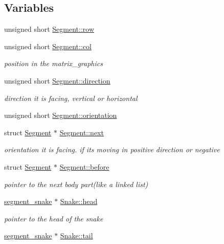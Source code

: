 \subsection*{Variables}
\begin{DoxyCompactItemize}
\item 
unsigned short \hyperlink{group__snake_ga5c86edfec316ae4d5033a85525babed6}{Segment\+::row}
\item 
unsigned short \hyperlink{group__snake_ga3369387554e0ec37bb04c153c3529ed9}{Segment\+::col}
\begin{DoxyCompactList}\small\item\em position in the matrix\+\_\+graphics \end{DoxyCompactList}\item 
unsigned short \hyperlink{group__snake_gacf610091b7f59fb0f1f37c6df4e14c18}{Segment\+::direction}
\begin{DoxyCompactList}\small\item\em direction it is facing, vertical or horizontal \end{DoxyCompactList}\item 
unsigned short \hyperlink{group__snake_gadd6c62d3fd2c3aab9175c07694fdc075}{Segment\+::orientation}
\item 
struct \hyperlink{structSegment}{Segment} $\ast$ \hyperlink{group__snake_ga20fb1741f720a656ec35972c2305a2d9}{Segment\+::next}
\begin{DoxyCompactList}\small\item\em orientation it is facing. if its moving in positive direction or negative \end{DoxyCompactList}\item 
struct \hyperlink{structSegment}{Segment} $\ast$ \hyperlink{group__snake_ga60c4d032ff0baffc3c99c1630dae24e3}{Segment\+::before}
\begin{DoxyCompactList}\small\item\em pointer to the next body part(like a linked list) \end{DoxyCompactList}\item 
\hyperlink{group__snake_ga40f634d31a1f9372bd182d65da207a21}{segment\+\_\+snake} $\ast$ \hyperlink{group__snake_gaf63e50ac65f365d67ae3975a178cba8c}{Snake\+::head}
\begin{DoxyCompactList}\small\item\em pointer to the head of the snake \end{DoxyCompactList}\item 
\hyperlink{group__snake_ga40f634d31a1f9372bd182d65da207a21}{segment\+\_\+snake} $\ast$ \hyperlink{group__snake_gada92e10f60af5b1afdb7318df07a1a33}{Snake\+::tail}

\end{DoxyCompactItemize}
